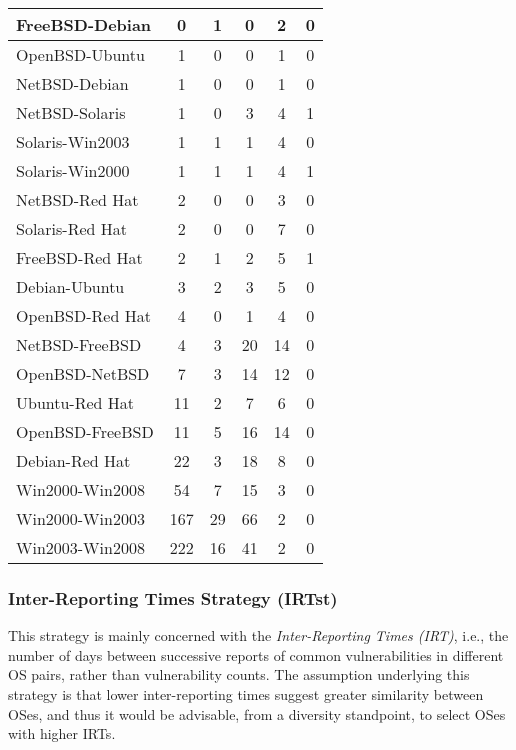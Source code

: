 \begin{table}[!ht]
\begin{center}
{\begin{tabular}{|l||c c c c c|}
FreeBSD-Debian & 0 & 1 & 0 & 2 & 0 \\ \hline
OpenBSD-Ubuntu & 1 & 0 & 0 & 1 & 0  \\
NetBSD-Debian & 1 & 0 & 0 & 1 & 0 \\
NetBSD-Solaris & 1 & 0 & 3 & 4 & 1 \\
Solaris-Win2003 & 1 & 1 & 1 & 4 & 0 \\
Solaris-Win2000 & 1 & 1 & 1 & 4 & 1 \\
NetBSD-Red Hat & 2 & 0 & 0 & 3 & 0 \\
Solaris-Red Hat & 2 & 0 & 0 & 7 & 0\\
FreeBSD-Red Hat & 2 & 1 & 2 & 5 & 1\\
Debian-Ubuntu & 3 & 2 & 3 & 5 & 0\\
OpenBSD-Red Hat & 4 & 0 & 1 & 4 & 0\\
NetBSD-FreeBSD & 4 & 3 & 20 & 14 & 0 \\
OpenBSD-NetBSD & 7 & 3 & 14 & 12 & 0 \\
Ubuntu-Red Hat & 11 & 2 & 7 & 6 & 0 \\
OpenBSD-FreeBSD & 11 & 5 & 16 & 14 & 0 \\
Debian-Red Hat & 22 & 3 & 18 & 8 & 0 \\
Win2000-Win2008 & 54 & 7 & 15 & 3 & 0 \\
Win2000-Win2003 & 167 & 29 & 66 & 2 & 0 \\
Win2003-Win2008 & 222 & 16 & 41 & 2 & 0 \\ \hline
\end{tabular}
}
\end{center}
\end{table}




\subsubsection*{Inter-Reporting Times Strategy (IRTst)} \label{IRT} This strategy is mainly concerned with the \emph{Inter-Reporting Times (IRT)}, i.e., the number of days between successive reports of common vulnerabilities in different OS pairs, rather than vulnerability counts. The assumption underlying this strategy is that lower inter-reporting times suggest greater similarity between OSes, and thus it would be advisable, from a diversity standpoint, to select OSes with higher IRTs.

